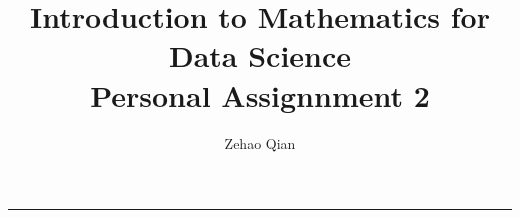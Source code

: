 \documentclass[11pt]{article} %
\title{Introduction to Mathematics for Data Science \\ Personal Assignnment 2}
\author{Zehao Qian}
\begin{document}
\maketitle
% 
% 
%  
\hrule

% 
% 
%
\newpage

% 
% 
%
\newpage

% 
% 
%
\newpage

% 
% 
% 
\newpage

% 
% 
% 
\end{document}
